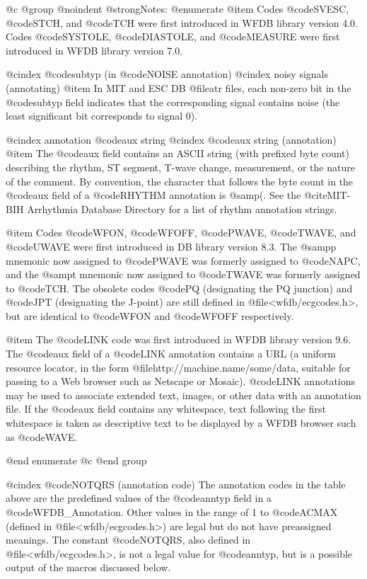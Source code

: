 {{{{{{{{{{@c @group
@noindent
@strong{Notes:}
@enumerate
@item
Codes @code{SVESC}, @code{STCH}, and @code{TCH} were first introduced
in WFDB library version 4.0.  Codes @code{SYSTOLE}, @code{DIASTOLE}, and
@code{MEASURE} were first introduced in WFDB library version 7.0.

@cindex @code{subtyp} (in @code{NOISE} annotation)
@cindex noisy signals (annotating)
@item
In MIT and ESC DB @file{atr} files, each non-zero bit in the @code{subtyp}
field indicates that the corresponding signal contains noise (the least
significant bit corresponds to signal 0).

@cindex annotation @code{aux} string
@cindex @code{aux} string (annotation)
@item
The @code{aux} field contains an ASCII string (with prefixed byte count)
describing the rhythm, ST segment, T-wave change, measurement, or the
nature of the comment.  By convention, the character that follows the
byte count in the @code{aux} field of a @code{RHYTHM} annotation is @samp{(}.
See the @cite{MIT-BIH Arrhythmia Database Directory} for a list of rhythm
annotation strings.

@item
Codes @code{WFON}, @code{WFOFF}, @code{PWAVE}, @code{TWAVE}, and
@code{UWAVE} were first introduced in DB library version 8.3.  The
@samp{p} mnemonic now assigned to @code{PWAVE} was formerly assigned to
@code{NAPC}, and the @samp{t} mnemonic now assigned to @code{TWAVE} was
formerly assigned to @code{TCH}.  The obsolete codes @code{PQ}
(designating the PQ junction) and @code{JPT} (designating the J-point)
are still defined in @file{<wfdb/ecgcodes.h>}, but are identical to
@code{WFON} and @code{WFOFF} respectively.

@item
The @code{LINK} code was first introduced in WFDB library version 9.6.  The
@code{aux} field of a @code{LINK} annotation contains a URL (a uniform
resource locator, in the form @file{http://machine.name/some/data},
suitable for passing to a Web browser such as Netscape or Mosaic).  @code{LINK}
annotations may be used to associate extended text, images, or other data with
an annotation file.  If the @code{aux} field contains any whitespace, text
following the first whitespace is taken as descriptive text to be displayed by
a WFDB browser such as @code{WAVE}.

@end enumerate
@c @end group

@cindex @code{NOTQRS} (annotation code)
The annotation codes in the table above are the predefined values of the
@code{anntyp} field in a @code{WFDB_Annotation}.  Other values in the range
of 1 to @code{ACMAX} (defined in @file{<wfdb/ecgcodes.h>}) are legal but
do not have preassigned meanings.  The constant @code{NOTQRS}, also defined in
@file{<wfdb/ecgcodes.h>}, is not a legal value for @code{anntyp}, but is
a possible output of the macros discussed below.

}}}}}}}}}}
